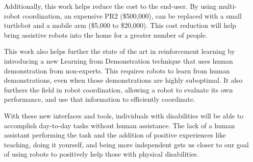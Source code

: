 \documentclass{article}
\begin{document}
Additionally, this work helps reduce the cost to the end-user. By using multi-robot coordination, an expensive PR2 (\$500,000), can be replaced with a small turtlebot and a mobile arm (\$5,000 to \$20,000). This cost reduction will help bring assistive robots into the home for a greater number of people.

This work also helps further the state of the art in reinforcement learning by introducing a new Learning from Demonstration technique that uses human demonstration from non-experts. This requires robots to learn from human demonstrations, even when those demonstrations are highly suboptimal. It also furthers the field in robot coordination, allowing a robot to evaluate its own performance, and use that information to efficiently coordinate.

With these new interfaces and tools, individuals with disabilities will be able to accomplish day-to-day tasks without human assistance. The lack of a human assistant performing the task and the addition of positive experiences like teaching, doing it yourself, and being more independent gets us closer to our goal of using robots to positively help those with physical disabilities.






\clearpage




\appendix
\end{document}
